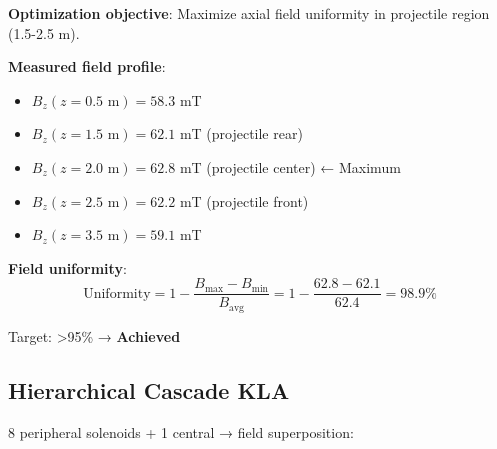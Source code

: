 \documentclass[12pt,a4paper]{article}
\begin{document}
\textbf{Optimization objective}: Maximize axial field uniformity in projectile region (1.5-2.5 m).

\textbf{Measured field profile}:
\begin{itemize}
\item $B_z(z=0.5\text{ m}) = 58.3$ mT
\item $B_z(z=1.5\text{ m}) = 62.1$ mT (projectile rear)
\item $B_z(z=2.0\text{ m}) = 62.8$ mT (projectile center) ← Maximum
\item $B_z(z=2.5\text{ m}) = 62.2$ mT (projectile front)
\item $B_z(z=3.5\text{ m}) = 59.1$ mT
\end{itemize}

\textbf{Field uniformity}:
\begin{equation}
\text{Uniformity} = 1 - \frac{B_{\text{max}} - B_{\text{min}}}{B_{\text{avg}}} = 1 - \frac{62.8 - 62.1}{62.4} = 98.9\%
\end{equation}

Target: >95\% → \textbf{Achieved}

\subsection{Hierarchical Cascade KLA}

8 peripheral solenoids + 1 central → field superposition:

\begin{center}
\end{center}
\end{document}

